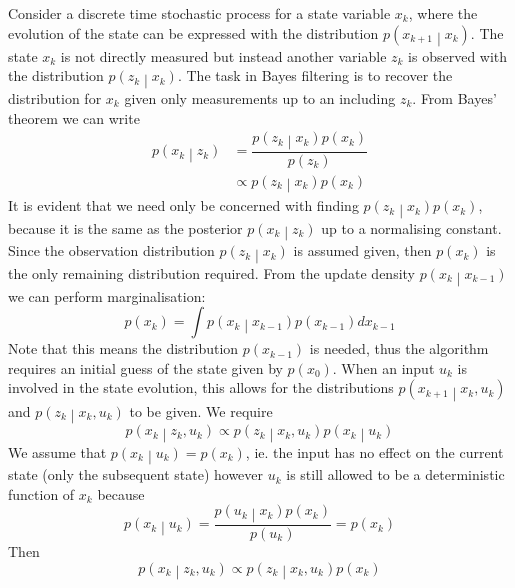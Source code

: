 \documentclass[11pt]{report} %
\begin{document}
Consider a discrete time stochastic process for a state variable $x_{k}$, where the evolution of the state can be expressed with the distribution $p\left(x_{k + 1}\middle|x_{k}\right)$. The state $x_{k}$ is not directly measured but instead another variable $z_{k}$ is observed with the distribution $p\left(z_{k}\middle|x_{k}\right)$. The task in Bayes filtering is to recover the distribution for $x_{k}$ given only measurements up to an including $z_{k}$. From Bayes' theorem we can write
\begin{align}
p\left(x_{k}\middle|z_{k}\right) &= \dfrac{p\left(z_{k}\middle|x_{k}\right)p\left(x_{k}\right)}{p\left(z_{k}\right)} \\
&\propto p\left(z_{k}\middle|x_{k}\right)p\left(x_{k}\right)
\end{align}
It is evident that we need only be concerned with finding $p\left(z_{k}\middle|x_{k}\right)p\left(x_{k}\right)$, because it is the same as the posterior $p\left(x_{k}\middle|z_{k}\right)$ up to a normalising constant. Since the observation distribution $p\left(z_{k}\middle|x_{k}\right)$ is assumed given, then $p\left(x_{k}\right)$ is the only remaining distribution required. From the update density $p\left(x_{k}\middle|x_{k - 1}\right)$ we can perform marginalisation:
\begin{equation}
p\left(x_{k}\right) = \int p\left(x_{k}\middle|x_{k - 1}\right)p\left(x_{k - 1}\right)dx_{k - 1}
\end{equation}
Note that this means the distribution $p\left(x_{k - 1}\right)$ is needed, thus the algorithm requires an initial guess of the state given by $p\left(x_{0}\right)$. When an input $u_{k}$ is involved in the state evolution, this allows for the distributions $p\left(x_{k + 1}\middle|x_{k}, u_{k}\right)$ and $p\left(z_{k}\middle|x_{k}, u_{k}\right)$ to be given. We require
\begin{equation}
p\left(x_{k}\middle|z_{k}, u_{k}\right) \propto p\left(z_{k}\middle|x_{k}, u_{k}\right)p\left(x_{k}\middle|u_{k}\right)
\end{equation}
We assume that $p\left(x_{k}\middle|u_{k}\right) = p\left(x_{k}\right)$, ie. the input has no effect on the current state (only the subsequent state) however $u_{k}$ is still allowed to be a deterministic function of $x_{k}$ because
\begin{equation}
p\left(x_{k}\middle|u_{k}\right) = \dfrac{p\left(u_{k}\middle|x_{k}\right)p\left(x_{k}\right)}{p\left(u_{k}\right)} = p\left(x_{k}\right)
\end{equation}
Then
\begin{equation}
p\left(x_{k}\middle|z_{k}, u_{k}\right) \propto p\left(z_{k}\middle|x_{k}, u_{k}\right)p\left(x_{k}\right)
\end{equation}
\end{document}

